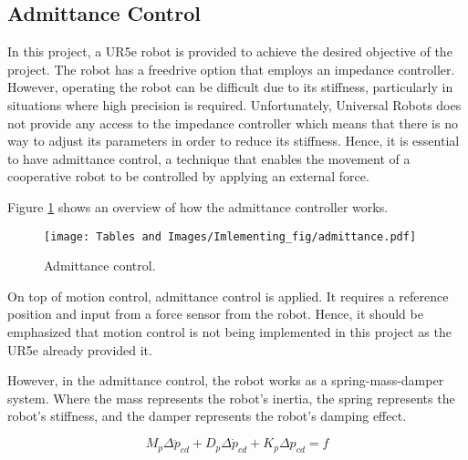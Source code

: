 \subsection{Admittance Control} \label{sec::admittance} 
In this project, a UR5e robot is provided to achieve the desired objective of the project. The robot has a freedrive option that employs an impedance controller. However, operating the robot can be difficult due to its stiffness, particularly in situations where high precision is required. Unfortunately, Universal Robots does not provide any access to the impedance controller which means that there is no way to adjust its parameters in order to reduce its stiffness. Hence, it is essential to have admittance control, a technique that enables the movement of a cooperative robot to be controlled by applying an external force. 

Figure \ref{fig:impl:Adm:Admittance_control} shows an overview of how the admittance controller works. 

\begin{figure}[H]
    \centering
    \texttt{[image: Tables and Images/Imlementing\_fig/admittance.pdf]}
    \vspace{-15mm}
    \caption{Admittance control.}
    \label{fig:impl:Adm:Admittance_control}
\end{figure}

On top of motion control, admittance control is applied. It requires a reference position and input from a force sensor from the robot. Hence, it should be emphasized that motion control is not being implemented in this project as the UR5e already provided it. 

However, in the admittance control, the robot works as a spring-mass-damper system. Where the mass represents the robot's inertia, the spring represents the robot's stiffness, and the damper represents the robot's damping effect. 

\begin{equation}
M_p\Delta\ddot{p}_{cd}+D_p\Delta\dot{p}_{cd}+K_p\Delta p_{cd} = f  
\label{eq:impl:admitance_transl_eq}
\end{equation}

